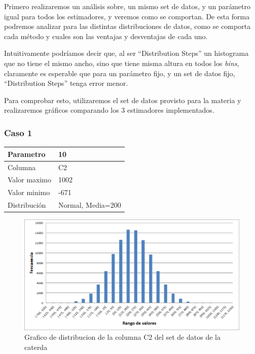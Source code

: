 \documentclass[10pt, a4paper]{article}
\begin{document}

		Primero realizaremos un an\'alisis sobre, un mismo set de datos, y un par\'ametro igual para todos los estimadores, y veremos como se comportan. De esta forma podremos analizar para las distintas distribuciones de datos, como se comporta cada m\'etodo y cuales son las ventajas y desventajas de cada uno.

		Intuitivamente podr\'iamos decir que, al ser ``Distribution Steps'' un histograma que no tiene el mismo ancho, sino que tiene misma altura en todos los \textit{bins}, claramente es esperable que para un par\'ametro fijo, y un set de datos fijo, ``Distribution Steps'' tenga error menor.
		
		Para comprobar esto, utilizaremos el set de datos provisto para la materia y realizaremos gr\'aficos comparando los 3 estimadores implementados. 
		
		\subsubsection*{Caso 1}
		
		\begin{tabular}{| l | l |}
		\hline
		Parametro & 10 \\
		\hline
		Columna & C2 \\
		\hline
		Valor maximo & 1002 \\
		\hline
		Valor minimo & -671 \\
		\hline
		Distribuci\'on & Normal, Media=200 \\
		\hline
		\end{tabular}

	\begin{figure}[H]
	  \begin{center}
	    \includegraphics[scale=.50]{imagenes/distro_C2.png}
	    \caption{Grafico de distribucion de la columna C2 del set de datos de la caterda} 
	    \label{fig:(distro_C2}
	  \end{center}
	\end{figure}
\end{document}
